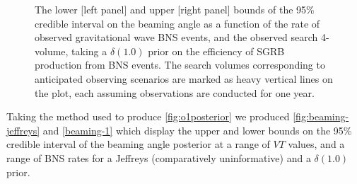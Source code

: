 \documentclass[openleft]{kentigern}
\theoremstyle{definition}
\begin{document}
\begin{figure}[b]
  \checkoddpage
   
  \caption{
    The lower [left panel] and upper [right panel] bounds of
    the 95\% credible interval on the beaming angle as a function of
    the rate of observed gravitational wave BNS events, and the
    observed search 4-volume, taking a $\delta(1.0)$ prior on the
    efficiency of SGRB production from BNS events. The search volumes
    corresponding to anticipated observing scenarios are marked as
    heavy vertical lines on the plot, each assuming observations are
    conducted for one year.
    \label{fig:beaming-1}
    }
\end{figure}

Taking the method used to produce \ref{fig:o1posterior} we produced
\ref{fig:beaming-jeffreys} and \ref{beaming-1} which display the upper
and lower bounds on the 95\% credible interval of the beaming angle
posterior at a range of $VT$ values, and a range of BNS rates for a
Jeffreys (comparatively uninformative) and a $\delta(1.0)$ prior.
\end{document}
